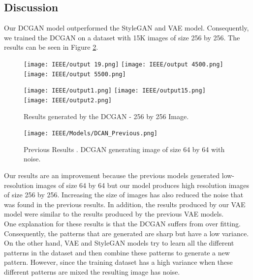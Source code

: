 \documentclass[conference]{IEEEtran}
\begin{document}
\subsection{Discussion}
Our DCGAN model outperformed the StyleGAN and VAE model. Consequently, we trained the DCGAN on a dataset with 15K images of size 256 by 256.  The results can be seen in Figure \ref{fig:initialchromsome}. 

\begin{figure}[h]
          \centering
          {%
            \texttt{[image: IEEE/output 19.png]}}\quad
          {%
            \texttt{[image: IEEE/output 4500.png]}}\quad
          {%
            \texttt{[image: IEEE/output 5500.png]}}
        \label{fig:initialchromsome}
\end{figure}
\begin{figure}[h]
          \centering
          {%
            \texttt{[image: IEEE/output1.png]}}\quad
          {%
            \texttt{[image: IEEE/output15.png]}}\quad
          {%
            \texttt{[image: IEEE/output2.png]}}
              \caption{Results generated by the DCGAN - 256 by 256 Image.}
        \label{fig:initialchromsome}
\end{figure}

\begin{figure}[h!]
    \centering
    \texttt{[image: IEEE/Models/DCAN\_Previous.png]}
    \caption{Previous Results \cite{inproceedings}. DCGAN generating image of size 64 by 64 with noise.}
    \label{fig:my_label}
\end{figure}
Our results are an improvement because the previous models generated low-resolution images of size 64 by 64 but our model produces high resolution images of size 256 by 256. Increasing the size of images has also reduced the noise that was found in the previous results. In addition, the results produced by our VAE model were similar to the results produced by the previous VAE models. \\
One explanation for these results is that the DCGAN suffers from over fitting. Consequently, the patterns that are generated are sharp but have a low variance. On the other hand, VAE and StyleGAN models try to learn all the different patterns in the dataset and then combine these patterns to generate a new pattern. However, since the training dataset has a high variance when these different patterns are mixed the resulting image has noise.
\end{document}
